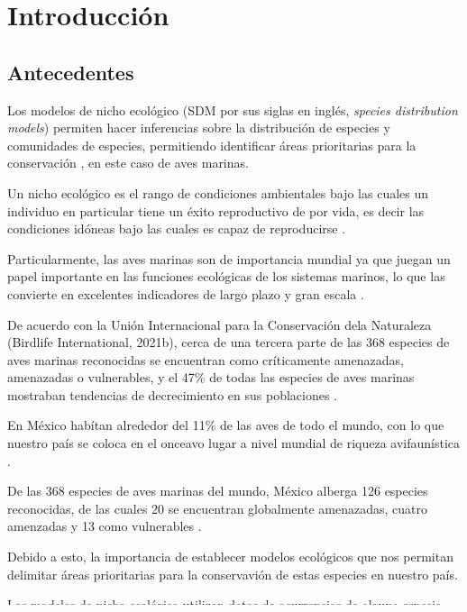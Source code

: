 \section*{Introducción}
\subsection*{Antecedentes}

Los modelos de nicho ecológico (SDM por sus siglas en inglés, \textit{species
distribution models}) permiten hacer inferencias sobre la distribución
de especies y comunidades de especies, permitiendo identificar áreas
prioritarias para la conservación \cite{flores2019ecological}, en este caso de
aves marinas.

Un nicho ecológico es el rango de condiciones ambientales bajo las cuales un
individuo en particular tiene un éxito reproductivo de por vida, es decir las
condiciones idóneas bajo las cuales es capaz de reproducirse
\cite{takola2022hutchinson}.

Particularmente, las aves marinas son de importancia mundial ya que juegan un
papel importante en las funciones ecológicas de los sistemas marinos, lo que las
convierte en excelentes indicadores de largo plazo y gran escala
\cite{furness1997seabirds}.

De acuerdo con la Unión Internacional para la Conservación dela Naturaleza
(Birdlife International, 2021b), cerca de una tercera parte de las 368 especies
de aves marinas reconocidas se encuentran como críticamente amenazadas,
amenazadas o vulnerables, y el 47\% de todas las especies de aves marinas
mostraban tendencias de decrecimiento en sus poblaciones \cite{dias2019threats}.

En México habítan alrededor del 11\% de las aves de todo el mundo, con lo que
nuestro país se coloca en el onceavo lugar a nivel mundial de riqueza
avifaunística \cite{mendez2021ecologia}.

De las 368 especies de aves marinas del mundo, México alberga 126 especies
reconocidas, de las cuales 20 se encuentran globalmente amenazadas, cuatro
amenzadas y 13 como vulnerables \cite{mendez2021ecologia}.

Debido a esto, la importancia de establecer modelos ecológicos que nos permitan
delimitar áreas prioritarias para la conservavión de estas especies en nuestro país.

Los modelos de nicho ecológico utilizan datos de ocurrencias de alguna especie
que junto con datos ambientales nos permiten modelar correlativamente las
condiciones ambientales bajo las que vive la especie en cuestión y así nos
permiten predecir su hábitat idóneo.

